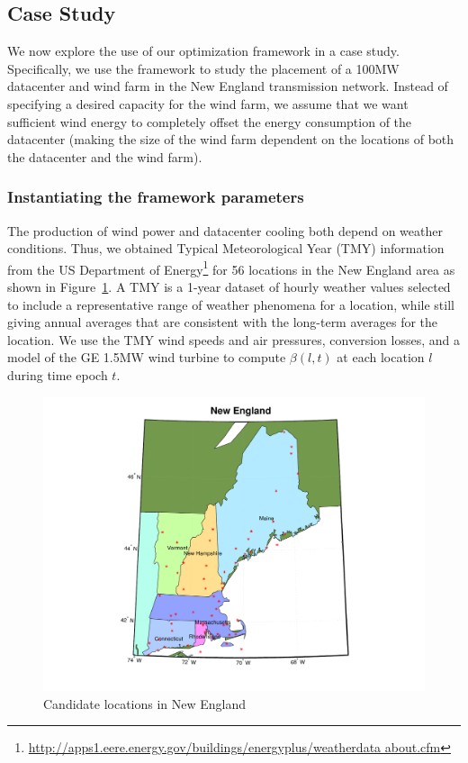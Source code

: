 \subsection{Case Study}
\label{sec:eval}

We now explore the use of our optimization framework in a case
study.  Specifically, we use the framework to study the placement of a 100MW
datacenter and wind farm in the New England transmission network.
Instead of specifying a desired capacity for the wind farm, we assume
that we want sufficient wind energy to completely offset the energy
consumption of the datacenter (making the size of the wind farm
dependent on the locations of both the datacenter and the wind farm).

\subsubsection{Instantiating the framework parameters}

The production of wind power and datacenter cooling both depend on
weather conditions.  Thus, we obtained Typical Meteorological Year
(TMY) information from the US Department of
Energy\footnote{\url{http://apps1.eere.energy.gov/buildings/energyplus/weatherdata
    about.cfm}} for 56 locations in the New England area as shown in
Figure~\ref{fig:NE_locs}.  A TMY is a 1-year dataset of hourly weather
values selected to include a representative range of weather phenomena
for a location, while still giving annual averages that are consistent
with the long-term averages for the location.
We use the TMY wind speeds and air pressures,
conversion losses, and a model of the GE 1.5MW wind
turbine \cite{lei2006modeling} to compute
$\beta(l,t)$ at each location $l$ during time epoch $t$.

\begin{figure}[ht]
\centering
\includegraphics[width=\columnwidth]{img/NE_map}
\vspace{-0.35in}
\caption{Candidate locations in New England}
\label{fig:NE_locs}
\end{figure}


